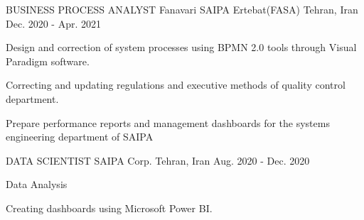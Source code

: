 

\begin{cventries}

  \cventry
    {BUSINESS PROCESS ANALYST} %
    {Fanavari SAIPA Ertebat(FASA)} %
    {Tehran, Iran} %
    {Dec. 2020 - Apr. 2021} %
    {
      \begin{cvitems} %
        \item {Design and correction of system processes using BPMN 2.0 tools through Visual Paradigm software.}
        \item {Correcting and updating regulations and executive methods of quality control department.}
        \item {Prepare performance reports and management dashboards for the systems engineering department of SAIPA}
      \end{cvitems}
    }

  \cventry
    {DATA SCIENTIST} %
    {SAIPA Corp.} %
    {Tehran, Iran} %
    {Aug. 2020 - Dec. 2020} %
    {
      \begin{cvitems} %
        \item {Data Analysis}
        \item {Creating dashboards using Microsoft Power BI.}
      \end{cvitems}
    }

\end{cventries}
